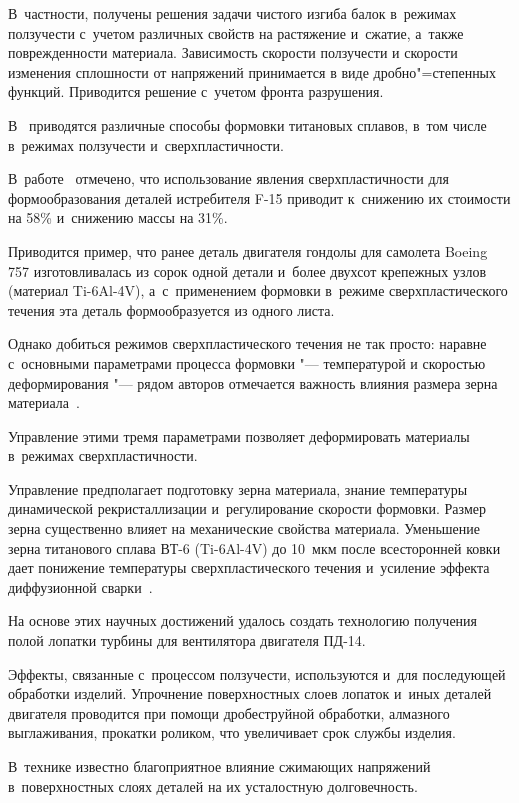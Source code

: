 В~частности, получены решения задачи чистого изгиба балок в~режимах ползучести с~учетом различных свойств на растяжение и~сжатие, а~также поврежденности материала. Зависимость скорости ползучести и скорости изменения сплошности от напряжений принимается в виде дробно"=степенных функций. Приводится решение с~учетом фронта разрушения.



В~\cite{iya:Beal} приводятся различные способы формовки титановых сплавов, в~том числе в~режимах ползучести и~сверхпластичности. 

В~работе~\cite{iya:Beal} отмечено, что использование явления сверхпластичности для формообразования деталей истребителя F-15 приводит к~снижению их стоимости на 58\% и~снижению массы на 31\%. 

Приводится пример, что ранее деталь двигателя гондолы для самолета Boeing 757 изготовливалась из сорок одной детали и~более двухсот крепежных узлов (материал Ti-6Al-4V), а~с~применением формовки в~режиме сверхпластического течения эта деталь формообразуется из одного листа.



Однако добиться режимов сверхпластического течения не так просто: наравне с~основными параметрами процесса формовки "--- температурой и скоростью деформирования "--- рядом авторов отмечается важность влияния размера зерна материала~\cite{iya:Kaibishev}. 

Управление этими тремя параметрами позволяет деформировать материалы в~режимах сверхпластичности. 

Управление предполагает подготовку зерна материала, знание температуры динамической рекристаллизации и~регулирование скорости формовки. Размер зерна существенно влияет на механические свойства материала. Уменьшение зерна титанового сплава ВТ-6 (Ti-6Al-4V) до 10~мкм после всесторонней ковки дает понижение температуры сверхпластического течения и~усиление эффекта диффузионной сварки~\cite{iya:Safiullin}. 

На основе этих научных достижений удалось создать технологию получения полой лопатки турбины для вентилятора двигателя ПД-14.



Эффекты, связанные с~процессом ползучести, используются и~для последующей обработки изделий. Упрочнение поверхностных слоев лопаток и~иных деталей двигателя проводится при помощи дробеструйной обработки, алмазного выглаживания, прокатки роликом, что увеличивает срок службы изделия. 

В~технике известно благоприятное влияние сжимающих напряжений в~поверхностных слоях деталей на их усталостную долговечность. 

